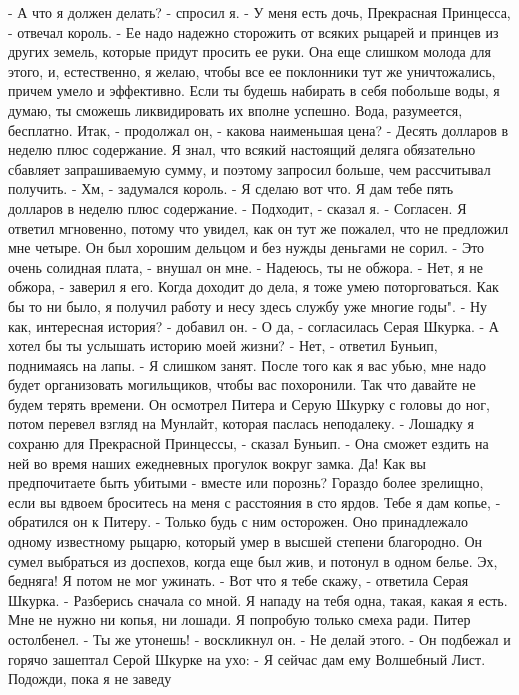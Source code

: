     - А что я должен делать? - спросил я.
    - У меня есть дочь, Прекрасная Принцесса, - отвечал король. - Ее 
надо надежно сторожить от всяких рыцарей и принцев из других земель, 
которые придут просить ее руки. Она еще слишком молода для этого, и, 
естественно, я желаю, чтобы все ее поклонники тут же уничтожались, 
причем умело и эффективно. Если ты будешь набирать в себя побольше 
воды, я думаю, ты сможешь ликвидировать их вполне успешно. Вода, 
разумеется, бесплатно. Итак, - продолжал он, - какова наименьшая цена?
    - Десять долларов в неделю плюс содержание.
    Я знал, что всякий настоящий деляга обязательно сбавляет 
запрашиваемую сумму, и поэтому запросил больше, чем рассчитывал 
получить.
    - Хм, - задумался король. - Я сделаю вот что. Я дам тебе пять 
долларов в неделю плюс содержание.
    - Подходит, - сказал я. - Согласен.
    Я ответил мгновенно, потому что увидел, как он тут же пожалел, что 
не предложил мне четыре. Он был хорошим дельцом и без нужды деньгами 
не сорил.
    - Это очень солидная плата, - внушал он мне. - Надеюсь, ты не 
обжора.
    - Нет, я не обжора, - заверил я его.
    Когда доходит до дела, я тоже умею поторговаться. Как бы то ни 
было, я получил работу и несу здесь службу уже многие годы".
    - Ну как, интересная история? - добавил он.
    - О да, - согласилась Серая Шкурка. - А хотел бы ты услышать 
историю моей жизни?
    - Нет, - ответил Буньип, поднимаясь на лапы. - Я слишком занят. 
После того как я вас убью, мне надо будет организовать могильщиков, 
чтобы вас похоронили. Так что давайте не будем терять времени.
    Он осмотрел Питера и Серую Шкурку с головы до ног, потом перевел 
взгляд на Мунлайт, которая паслась неподалеку.
    - Лошадку я сохраню для Прекрасной Принцессы, - сказал Буньип. - 
Она сможет ездить на ней во время наших ежедневных прогулок вокруг 
замка. Да! Как вы предпочитаете быть убитыми - вместе или порознь? 
Гораздо более зрелищно, если вы вдвоем броситесь на меня с расстояния 
в сто ярдов. Тебе я дам копье, - обратился он к Питеру. - Только будь 
с ним осторожен. Оно принадлежало одному известному рыцарю, который 
умер в высшей степени благородно. Он сумел выбраться из доспехов, 
когда еще был жив, и потонул в одном белье. Эх, бедняга! Я потом не 
мог ужинать.
    - Вот что я тебе скажу, - ответила Серая Шкурка. - Разберись 
сначала со мной. Я нападу на тебя одна, такая, какая я есть. Мне не 
нужно ни копья, ни лошади. Я попробую только смеха ради.
    Питер остолбенел.
    - Ты же утонешь! - воскликнул он. - Не делай этого. - Он подбежал 
и горячо зашептал Серой Шкурке на ухо:
    - Я сейчас дам ему Волшебный Лист. Подожди, пока я не заведу 
